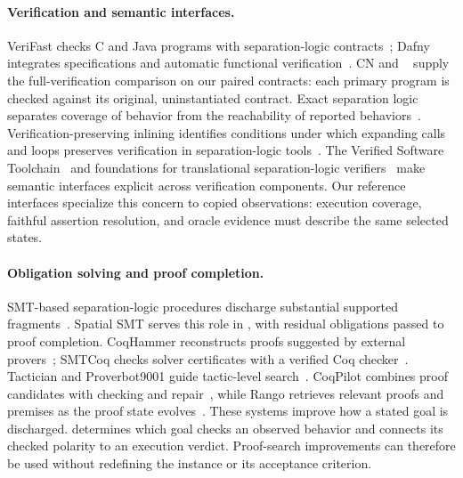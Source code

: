 \paragraph{Verification and semantic interfaces.}
VeriFast checks C and Java programs with separation-logic
contracts~\cite{jacobs2011verifast}; Dafny integrates specifications and
automatic functional verification~\cite{leino2010dafny}.
CN and \qcp{}~\cite{wu2026qcp} supply the full-verification comparison on
our paired contracts: each primary program is checked against its original,
uninstantiated contract. Exact separation logic separates coverage of
behavior from the reachability of reported
behaviors~\cite{maksimovic2023exact}. Verification-preserving inlining
identifies conditions under which expanding calls and loops preserves
verification in separation-logic tools~\cite{dardinier2023inlining}.
The Verified Software Toolchain~\cite{app2011vst} and foundations for
translational separation-logic verifiers~\cite{dardinier2025foundations}
make semantic interfaces explicit across verification components.
Our reference interfaces specialize this concern to copied observations:
execution coverage, faithful assertion resolution, and oracle evidence
must describe the same selected states.

\paragraph{Obligation solving and proof completion.}
SMT-based separation-logic procedures discharge substantial supported
fragments~\cite{piskac2013smt,reynolds2016sl}. Spatial SMT serves this role
in \tespec{}, with residual obligations passed to proof completion.
CoqHammer reconstructs proofs suggested by external
provers~\cite{czajka2018coqhammer}; SMTCoq checks solver certificates with
a verified Coq checker~\cite{ekici2017smtcoq}.
Tactician and Proverbot9001 guide tactic-level
search~\cite{blaauwbroek2020tactician,sanchezstern2020proverbot}.
CoqPilot combines proof candidates with checking and
repair~\cite{kozyrev2024coqpilot}, while Rango retrieves relevant proofs
and premises as the proof state evolves~\cite{thompson2025rango}.
These systems improve how a stated goal is discharged. \tespec{} determines
which goal checks an observed behavior and connects its checked polarity
to an execution verdict. Proof-search improvements can therefore be used
without redefining the instance or its acceptance criterion.
